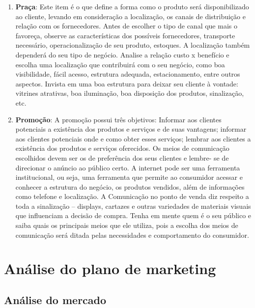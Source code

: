 \documentclass[
	12pt,				%
	openright,			%
	oneside,			%
	a4paper,			%
	english,			%
	french,				%
	spanish,			%
	brazil				%
	]{abntex2}
\begin{document}
\begin{enumerate}
		\item \textbf{Praça}: Este item é o que define a forma como o produto será disponibilizado ao cliente, levando em consideração a localização, os canais de distribuição e relação com os fornecedores. Antes de escolher o tipo de canal que mais o favoreça, observe as características dos possíveis fornecedores, transporte necessário, operacionalização de seu produto, estoques. A localização também dependerá do seu tipo de negócio. Analise a relação custo x benefício e escolha uma localização que contribuirá com o seu negócio, como boa visibilidade, fácil acesso, estrutura adequada, estacionamento, entre outros aspectos. Invista em uma boa estrutura para deixar seu cliente à vontade: vitrines atrativas, boa iluminação, boa disposição dos produtos, sinalização, etc.
		\item \textbf{Promoção}: A promoção possui três objetivos: Informar aos clientes potenciais a existência dos produtos e serviços e de suas vantagens; informar aos clientes potenciais onde e como obter esses serviços; lembrar aos clientes a existência dos produtos e serviços oferecidos. Os meios de comunicação escolhidos devem ser os de preferência dos seus clientes e lembre- se de direcionar o anúncio ao público certo. A internet pode ser uma ferramenta institucional, ou seja, uma ferramenta que permite ao consumidor acessar e conhecer a estrutura do negócio, os produtos vendidos, além de informações como telefone e localização. A Comunicação no ponto de venda diz respeito a toda a sinalização – displays, cartazes e outras variedades de materiais visuais que influenciam a decisão de compra. Tenha em mente quem é o seu público e saiba quais os principais meios que ele utiliza, pois a escolha dos meios de comunicação será ditada pelas necessidades e comportamento do consumidor.
	\end{enumerate}

\section[Análise do plano de marketing]{Análise do plano de marketing}

\subsection[Análise do mercado]{Análise do mercado}
\end{document}
